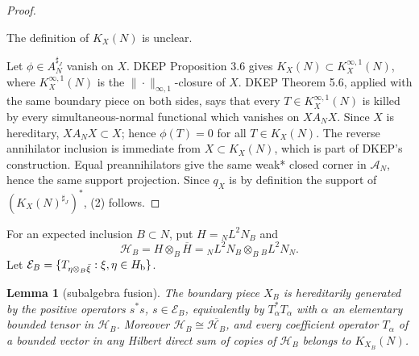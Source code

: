 \documentclass[12pt]{article}
\newtheorem{lemma}{Lemma}
\newcommand{\cA}{\mathcal A}
\newcommand{\cH}{\mathcal H}
\newcommand{\review}[1]{\begin{reviewbox}#1\end{reviewbox}}
\begin{document}
\begin{proof}
\review{The definition of $K_X(N)$ is unclear.}

Let \(\phi\in A_N^{\sharp_J}\) vanish on \(X\).  DKEP Proposition 3.6 gives
\(K_X(N)\subset K_X^{\infty,1}(N)\), where \(K_X^{\infty,1}(N)\) is the
\(\|\cdot\|_{\infty,1}\)-closure of \(X\).  DKEP Theorem 5.6, applied with the
same boundary piece on both sides, says that every
\(T\in K_X^{\infty,1}(N)\) is killed by every simultaneous-normal functional
which vanishes on \(X A_N X\).  Since \(X\) is hereditary, \(X A_N X\subset X\);
hence \(\phi(T)=0\) for all \(T\in K_X(N)\).  The reverse annihilator inclusion
is immediate from \(X\subset K_X(N)\), which is part of DKEP's construction.
Equal preannihilators give the same weak* closed corner in \(\cA_N\), hence the
same support projection.  Since \(q_X\) is by definition the support of
\((K_X(N)^{\sharp_J})^*\), (2) follows.
\end{proof}

For an expected inclusion \(B\subset N\), put \(H={}_NL^2N_B\) and
\[
        \cH_B=H\otimes_B\overline H
             ={}_NL^2N_B\otimes_B{}_BL^2N_N .
\]
Let \(\mathcal E_B=\{T_{\eta\otimes_B\bar\xi}:\xi,\eta\in H_{\rm b}\}\).

\begin{lemma}[subalgebra fusion]\label{lem:subalg}
The boundary piece \(X_B\) is hereditarily generated by the positive
operators \(s^*s\), \(s\in\mathcal E_B\), equivalently by
\(T_\alpha^*T_\alpha\) with \(\alpha\) an elementary bounded tensor in
\(\cH_B\).  Moreover \(\cH_B\cong\overline{\cH_B}\), and every coefficient
operator \(T_\alpha\) of a bounded vector in any Hilbert direct sum of copies
of \(\cH_B\) belongs to \(K_{X_B}(N)\).
\end{lemma}
\end{document}
